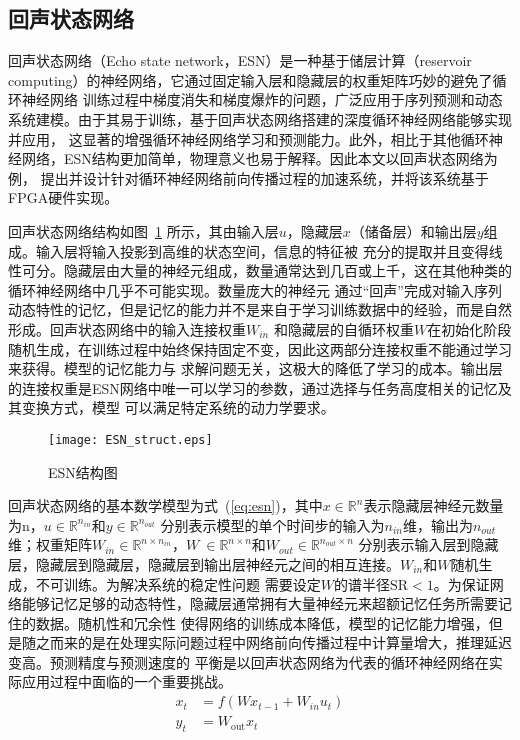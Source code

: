 \subsection{回声状态网络}
回声状态网络（Echo state network，ESN）是一种基于储层计算（reservoir computing）的神经网络，它通过固定输入层和隐藏层的权重矩阵巧妙的避免了循环神经网络
训练过程中梯度消失和梯度爆炸的问题，广泛应用于序列预测和动态系统建模。由于其易于训练，基于回声状态网络搭建的深度循环神经网络能够实现并应用，
这显著的增强循环神经网络学习和预测能力。此外，相比于其他循环神经网络，ESN结构更加简单，物理意义也易于解释。因此本文以回声状态网络为例，
提出并设计针对循环神经网络前向传播过程的加速系统，并将该系统基于FPGA硬件实现。

回声状态网络结构如图~\ref{fig:esn} 所示，其由输入层\(u\)，隐藏层\(x\)（储备层）和输出层\(y\)组成。输入层将输入投影到高维的状态空间，信息的特征被
充分的提取并且变得线性可分。隐藏层由大量的神经元组成，数量通常达到几百或上千，这在其他种类的循环神经网络中几乎不可能实现。数量庞大的神经元
通过“回声”完成对输入序列动态特性的记忆，但是记忆的能力并不是来自于学习训练数据中的经验，而是自然形成。回声状态网络中的输入连接权重\(W_{in}\)
和隐藏层的自循环权重\(W\)在初始化阶段随机生成，在训练过程中始终保持固定不变，因此这两部分连接权重不能通过学习来获得。模型的记忆能力与
求解问题无关，这极大的降低了学习的成本。输出层的连接权重是ESN网络中唯一可以学习的参数，通过选择与任务高度相关的记忆及其变换方式，模型
可以满足特定系统的动力学要求。

\begin{figure}
	\centering
	\texttt{[image: ESN\_struct.eps]}
	\caption{ESN结构图}
	\label{fig:esn}
\end{figure}

回声状态网络的基本数学模型为式~(\ref{eq:esn})，其中\(x\in \mathbb{R}^n\)表示隐藏层神经元数量为n，\(u \in \mathbb{R}^{n_{in}}\)和\(y \in \mathbb{R}^{n_{out}}\)
分别表示模型的单个时间步的输入为\(n_{in}\)维，输出为\(n_{out}\)维；权重矩阵\(W_{in} \in \mathbb{R}^{n \times n_{in}}\)，\(W\ \in \mathbb{R}^{n \times n}\)和\(W_{out} \in \mathbb{R}^{n_{out} \times n}\)
分别表示输入层到隐藏层，隐藏层到隐藏层，隐藏层到输出层神经元之间的相互连接。\(W_{in}\)和\(W\)随机生成，不可训练。为解决系统的稳定性问题
需要设定\(W\)的谱半径\(\mathrm{SR} < 1\)。为保证网络能够记忆足够的动态特性，隐藏层通常拥有大量神经元来超额记忆任务所需要记住的数据。随机性和冗余性
使得网络的训练成本降低，模型的记忆能力增强，但是随之而来的是在处理实际问题过程中网络前向传播过程中计算量增大，推理延迟变高。预测精度与预测速度的
平衡是以回声状态网络为代表的循环神经网络在实际应用过程中面临的一个重要挑战。
\begin{equation}\label{eq:esn}
	\begin{split}
		x_{t} &= f(W x_{t-1} + W_{in} u_{t})	\\
		y_{t} &= W_{\mathrm{out}} x_{t}				
	\end{split}
\end{equation}

